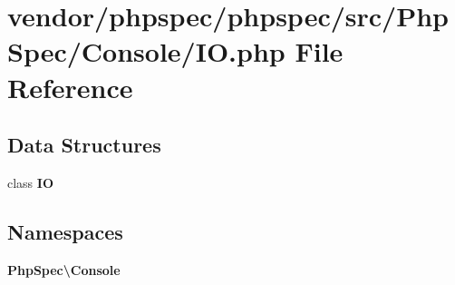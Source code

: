 \section{vendor/phpspec/phpspec/src/\+Php\+Spec/\+Console/\+I\+O.php File Reference}
\label{_console_2_i_o_8php}
\subsection*{Data Structures}
\begin{DoxyCompactItemize}
\item 
class {\bf I\+O}
\end{DoxyCompactItemize}
\subsection*{Namespaces}
\begin{DoxyCompactItemize}
\item 
 {\bf Php\+Spec\textbackslash{}\+Console}
\end{DoxyCompactItemize}
